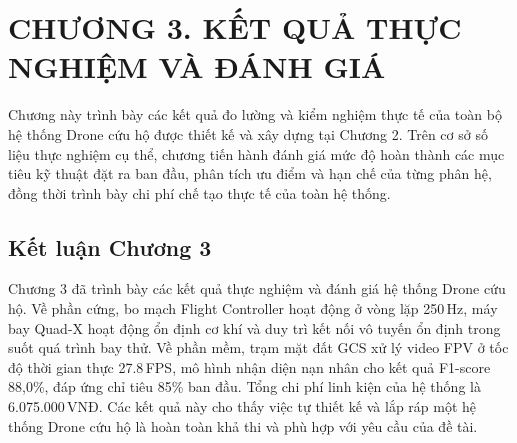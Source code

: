 \section*{CHƯƠNG 3. KẾT QUẢ THỰC NGHIỆM VÀ ĐÁNH GIÁ}
\setcounter{section}{3}
\setcounter{subsection}{0}
\setcounter{figure}{0}
\setcounter{table}{0}

Chương này trình bày các kết quả đo lường và kiểm nghiệm thực tế của toàn bộ hệ thống Drone cứu hộ được thiết kế và xây dựng tại Chương 2. Trên cơ sở số liệu thực nghiệm cụ thể, chương tiến hành đánh giá mức độ hoàn thành các mục tiêu kỹ thuật đặt ra ban đầu, phân tích ưu điểm và hạn chế của từng phân hệ, đồng thời trình bày chi phí chế tạo thực tế của toàn hệ thống.



\subsection*{Kết luận Chương 3}

Chương 3 đã trình bày các kết quả thực nghiệm và đánh giá hệ thống Drone cứu hộ. Về phần cứng, bo mạch Flight Controller hoạt động ở vòng lặp 250\,Hz, máy bay Quad-X hoạt động ổn định cơ khí và duy trì kết nối vô tuyến ổn định trong suốt quá trình bay thử. Về phần mềm, trạm mặt đất GCS xử lý video FPV ở tốc độ thời gian thực 27.8\,FPS, mô hình nhận diện nạn nhân cho kết quả F1-score 88,0\%, đáp ứng chỉ tiêu 85\% ban đầu. Tổng chi phí linh kiện của hệ thống là 6.075.000\,VNĐ. Các kết quả này cho thấy việc tự thiết kế và lắp ráp một hệ thống Drone cứu hộ là hoàn toàn khả thi và phù hợp với yêu cầu của đề tài.
